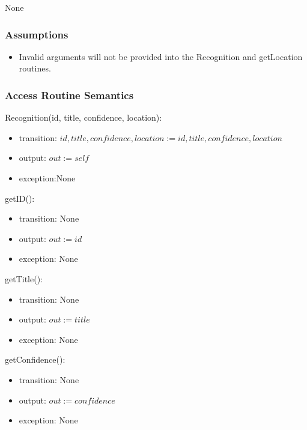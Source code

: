 \documentclass[12pt, titlepage]{article}
\begin{document}
None

\subsubsection* {Assumptions}

\begin{itemize}
\item Invalid arguments will not be provided into the Recognition and getLocation routines.
\end{itemize}

\subsubsection* {Access Routine Semantics}

\noindent Recognition(id, title, confidence, location):
\begin{itemize}
\item transition: $ id, title, confidence,location := id, title, confidence, location$
\item output: $out := self$ \\
\item exception:None \\

\end{itemize}

\noindent getID():
\begin{itemize}
\item transition: None\\
\item output: $out := id$\\
\item exception: None\\

\end{itemize}

\noindent getTitle():
\begin{itemize}
\item transition: None\\
\item output: $out := title$\\
\item exception: None\\

\end{itemize}

\noindent getConfidence():
\begin{itemize}
\item transition: None\\
\item output: $out := confidence$\\
\item exception: None\\

\end{itemize}
\end{document}
